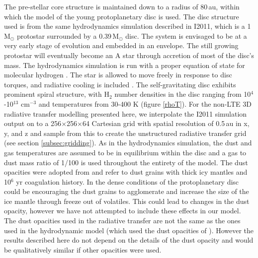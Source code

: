 \documentclass[useAMS,usenatbib]{mn2e}
\begin{document}
The pre-stellar core structure is maintained down to a radius of 80\,au, within which the model of the young protoplanetary disc is used. The disc structure used is from the same hydrodynamics simulation described in I2011, which is a 1$\,$M$_\odot$ protostar surrounded by a 0.39$\,$M$_\odot$ disc. The system is envisaged to be at a very early stage of evolution and embedded in an envelope.  The still growing protostar will eventually become an A star through accretion of most of the disc's mass. The hydrodynamics simulation is run with a proper equation of state for molecular hydrogen \citep{Boley2007}.  The star is allowed to move freely in response to disc torques, and radiative cooling is included \citep{Boley2009}. The self-gravitating disc exhibits prominent spiral structure, with H$_2$ number densities in the disc ranging from 10$^4$-10$^{13}$ cm$^{-3}$ and temperatures from 30-400 K (figure \ref{rhoT}). For the non-LTE 3D radiative transfer modelling presented here, we interpolate the I2011 simulation output on to a 256$\times$256$\times$64 Cartesian grid with spatial resolution of 0.5$\,$au in x, y, and z and sample from this to create the unstructured radiative transfer grid (see section \ref{subsec:gridding}).  As in the hydrodynamics simulation, the dust and gas temperatures are assumed to be in equilibrium within the disc and a gas to dust mass ratio of 1/100 is used throughout the entirety of the model. The dust opacities were adopted from \citet{Ossenkopf1994} and refer to dust grains with thick icy mantles and 10$^6$ yr coagulation history. In the dense conditions of the protoplanetary disc could be encouraging the dust grains to agglomerate and increase the size of the ice mantle through freeze out of volatiles. This could lead to changes in the dust opacity, however we have not attempted to include these effects in our model. The dust opacities used in the radiative transfer are not the same as the ones used in the hydrodynamic model (which used the dust opacities of \citealt{DAlessio2001}). However the results described here do not depend on the details of the dust opacity and would be qualitatively similar if other opacities were used.\smallskip
\end{document}
